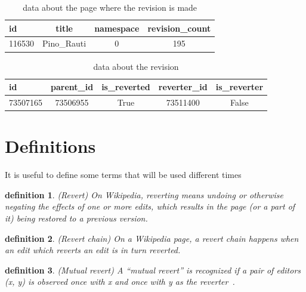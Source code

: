 \begin{table}[H]
    \centering
    \begin{tabularx}{\columnwidth}{@{}Xccc@{}}
        \midrule
        \textbf{id} & \textbf{title} & \textbf{namespace} & \textbf{revision\_count} \\ \toprule
        116530 & Pino\_Rauti & 0 &  195 
        \\

         \bottomrule
    \end{tabularx}
    \caption{data about the page where the revision is made}
\end{table}

\begin{table}[H]
    \centering
    \begin{tabularx}{\columnwidth}{@{}Xcccc@{}}
        \midrule
        \textbf{id} & \textbf{parent\_id} & \textbf{is\_reverted} & \textbf{reverter\_id} & \textbf{is\_reverter} \\ \toprule
        73507165 & 73506955 & True &  73511400 & False 
        \\

         \bottomrule
    \end{tabularx}
    \caption{data about the revision}
\end{table}


\section{Definitions}
It is useful to define some terms that will be used different times

\newtheorem{definition}{definition}
\begin{definition}
    (Revert) On Wikipedia, reverting means undoing or otherwise negating the effects of one or more edits,
    which results in the page (or a part of it) being restored to a previous version. 
\end{definition}

\begin{definition}
    (Revert chain) On a Wikipedia page, a revert chain happens when an edit which reverts an edit is in turn reverted.
\end{definition}

\begin{definition}
    (Mutual revert) A “mutual revert” is recognized if a pair of editors (x, y) is observed once with x and once with y as the reverter~\cite{Yasseri2014}.
\end{definition}

